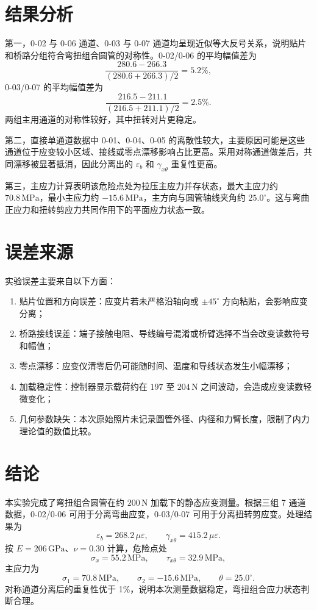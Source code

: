 \documentclass[UTF8,a4paper,10pt]{ctexart}
\newcommand{\ue}{\mu\varepsilon}
\begin{document}
\section{结果分析}

第一，0-02 与 0-06 通道、0-03 与 0-07 通道均呈现近似等大反号关系，说明贴片和桥路分组符合弯扭组合圆管的对称性。0-02/0-06 的平均幅值差为
\begin{equation}
    \frac{280.6-266.3}{(280.6+266.3)/2}=5.2\%,
\end{equation}
0-03/0-07 的平均幅值差为
\begin{equation}
    \frac{216.5-211.1}{(216.5+211.1)/2}=2.5\%.
\end{equation}
两组主用通道的对称性较好，其中扭转对片更稳定。

第二，直接单通道数据中 0-01、0-04、0-05 的离散性较大，主要原因可能是这些通道位于应变较小区域、接线或零点漂移影响占比更高。采用对称通道做差后，共同漂移被显著抵消，因此分离出的 $\varepsilon_b$ 和 $\gamma_{x\theta}$ 重复性更高。

第三，主应力计算表明该危险点处为拉压主应力并存状态，最大主应力约 $70.8\,\mathrm{MPa}$，最小主应力约 $-15.6\,\mathrm{MPa}$，主方向与圆管轴线夹角约 $25.0^\circ$。这与弯曲正应力和扭转剪应力共同作用下的平面应力状态一致。

\section{误差来源}

实验误差主要来自以下方面：
\begin{enumerate}
    \item 贴片位置和方向误差：应变片若未严格沿轴向或 $\pm45^\circ$ 方向粘贴，会影响应变分离；
    \item 桥路接线误差：端子接触电阻、导线编号混淆或桥臂选择不当会改变读数符号和幅值；
    \item 零点漂移：应变仪清零后仍可能随时间、温度和导线状态发生小幅漂移；
    \item 加载稳定性：控制器显示载荷约在 $197$ 至 $204\,\mathrm{N}$ 之间波动，会造成应变读数轻微变化；
    \item 几何参数缺失：本次原始照片未记录圆管外径、内径和力臂长度，限制了内力理论值的数值比较。
\end{enumerate}

\section{结论}

本实验完成了弯扭组合圆管在约 $200\,\mathrm{N}$ 加载下的静态应变测量。根据三组 7 通道数据，0-02/0-06 可用于分离弯曲应变，0-03/0-07 可用于分离扭转剪应变。处理结果为
\[
    \varepsilon_b=268.2\,\ue,\qquad
    \gamma_{x\theta}=415.2\,\ue .
\]
按 $E=206\,\mathrm{GPa}$、$\nu=0.30$ 计算，危险点处
\[
    \sigma_x=55.2\,\mathrm{MPa},\qquad
    \tau_{x\theta}=32.9\,\mathrm{MPa},
\]
主应力为
\[
    \sigma_1=70.8\,\mathrm{MPa},\qquad
    \sigma_2=-15.6\,\mathrm{MPa},\qquad
    \theta=25.0^\circ .
\]
对称通道分离后的重复性优于 1\%，说明本次测量数据稳定，弯扭组合应力状态判断合理。
\end{document}
